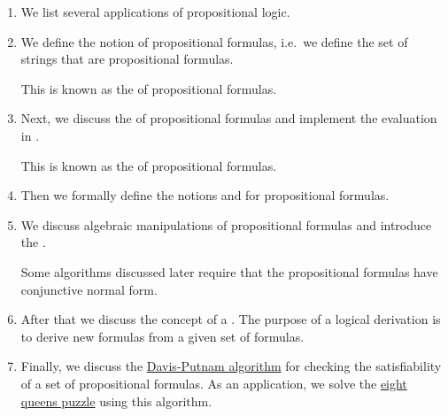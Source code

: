 \begin{enumerate}
\item We list several applications of propositional logic.
\item We define the notion of propositional formulas, i.e.~we define the set of strings that are
      propositional formulas.

      This is known as the  of propositional formulas.
\item Next, we discuss the  of propositional formulas and implement the evaluation in \Fsharp.

      This is known as the  of propositional formulas.
\item Then we formally define the notions  and  for propositional formulas.   
\item We discuss algebraic manipulations of propositional formulas and introduce the 
      .

      Some algorithms discussed later require that the propositional formulas have conjunctive normal form.
\item After that we discuss the concept of a .  The purpose of a logical derivation is to
      derive new formulas from a given set of formulas.
\item Finally, we discuss the \href{https://en.wikipedia.org/wiki/Davis–Putnam_algorithm}{Davis-Putnam
      algorithm} for checking the satisfiability of a set of  propositional formulas.  As an application, we
      solve the \href{https://en.wikipedia.org/wiki/Eight_queens_puzzle}{eight queens puzzle} using this algorithm.
\end{enumerate}

